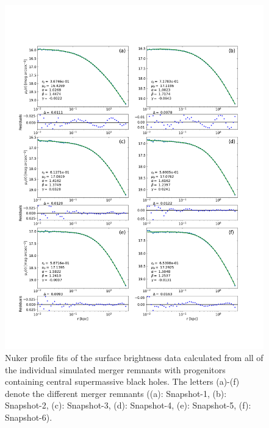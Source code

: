 \documentclass[english, oneside]{HYgradu}
\begin{document}
\begin{figure}[h]
	\centering
	\includegraphics[width=\textwidth]{all_nuker_profiles.png}
	\caption{Nuker profile fits of the surface brightness data calculated from all of the individual simulated merger remnants with progenitors containing central supermassive black holes. The letters (a)-(f) denote the different merger remnants ((a): Snapshot-1, (b): Snapshot-2, (c): Snapshot-3, (d): Snapshot-4, (e): Snapshot-5, (f): Snapshot-6).}
	\label{figure:all_nuker}
\end{figure}
\end{document}
